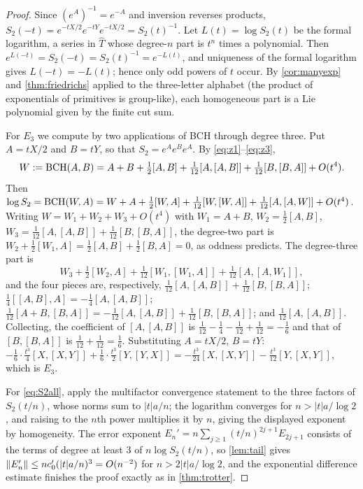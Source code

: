 \begin{proof}
Since $(e^{A})^{-1}=e^{-A}$ and inversion reverses products,
$S_2(-t)=e^{-tX/2}e^{-tY}e^{-tX/2}=S_2(t)^{-1}$. Let $L(t)=\log S_2(t)$ be
the formal logarithm, a series in $\widehat T$ whose degree-$n$ part is
$t^n$ times a polynomial. Then $e^{L(-t)}=S_2(-t)=S_2(t)^{-1}=e^{-L(t)}$,
and uniqueness of the formal logarithm gives $L(-t)=-L(t)$; hence only odd
powers of $t$ occur. By \cref{cor:manyexp} and \cref{thm:friedrichs}
applied to the three-letter alphabet (the product of exponentials of
primitives is group-like), each homogeneous part is a Lie polynomial given
by the finite cut sum.

For $E_3$ we compute by two applications of BCH through degree three. Put
$A=tX/2$ and $B=tY$, so that $S_2=e^Ae^Be^A$. By
\eqref{eq:z1}--\eqref{eq:z3},
\[
 W:=\operatorname{BCH}(A,B)=A+B+\tfrac12[A,B]+\tfrac1{12}[A,[A,B]]+\tfrac1{12}[B,[B,A]]+O(t^4).
\]
Then $\log S_2=\operatorname{BCH}(W,A)=W+A+\tfrac12[W,A]+\tfrac1{12}[W,[W,A]]+\tfrac1{12}[A,[A,W]]+O(t^4)$.
Writing $W=W_1+W_2+W_3+O(t^4)$ with $W_1=A+B$, $W_2=\tfrac12[A,B]$,
$W_3=\tfrac1{12}[A,[A,B]]+\tfrac1{12}[B,[B,A]]$, the degree-two part is
$W_2+\tfrac12[W_1,A]=\tfrac12[A,B]+\tfrac12[B,A]=0$, as oddness predicts.
The degree-three part is
\[
 W_3+\tfrac12[W_2,A]+\tfrac1{12}[W_1,[W_1,A]]+\tfrac1{12}[A,[A,W_1]],
\]
and the four pieces are, respectively,
$\tfrac1{12}[A,[A,B]]+\tfrac1{12}[B,[B,A]]$;
$\tfrac14[[A,B],A]=-\tfrac14[A,[A,B]]$;
$\tfrac1{12}[A+B,[B,A]]=-\tfrac1{12}[A,[A,B]]+\tfrac1{12}[B,[B,A]]$; and
$\tfrac1{12}[A,[A,B]]$. Collecting, the coefficient of $[A,[A,B]]$ is
$\tfrac1{12}-\tfrac14-\tfrac1{12}+\tfrac1{12}=-\tfrac16$ and that of
$[B,[B,A]]$ is $\tfrac1{12}+\tfrac1{12}=\tfrac16$. Substituting
$A=tX/2$, $B=tY$: $-\tfrac16\cdot\tfrac{t^3}4[X,[X,Y]]+\tfrac16\cdot\tfrac{t^3}2[Y,[Y,X]]
=-\tfrac{t^3}{24}[X,[X,Y]]-\tfrac{t^3}{12}[Y,[X,Y]]$, which is $E_3$.

For \eqref{eq:S2all}, apply the multifactor convergence statement to the
three factors of $S_2(t/n)$, whose norms sum to $|t|a/n$; the logarithm
converges for $n>|t|a/\log2$, and raising to the $n$th power multiplies
it by $n$, giving the displayed exponent by homogeneity. The error
exponent $E_n'=n\sum_{j\geq1}(t/n)^{2j+1}E_{2j+1}$ consists of the terms of
degree at least $3$ of $n\log S_2(t/n)$, so \cref{lem:tail} gives
$\left\lVert E_n'\right\rVert\leq nc_0'(|t|a/n)^3=O(n^{-2})$ for $n>2|t|a/\log2$, and the
exponential difference estimate finishes the proof exactly as in
\cref{thm:trotter}.


\end{proof}
